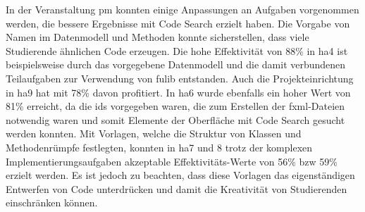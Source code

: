 In der Veranstaltung \ac{pm} konnten einige Anpassungen an Aufgaben vorgenommen werden, die bessere Ergebnisse mit Code Search erzielt haben.
Die Vorgabe von Namen im Datenmodell und Methoden konnte sicherstellen, dass viele Studierende ähnlichen Code erzeugen.
Die hohe Effektivität von 88\% in \ac{ha}4 ist beispielsweise durch das vorgegebene Datenmodell und die damit verbundenen Teilaufgaben zur Verwendung von fulib entstanden.
Auch die Projekteinrichtung in \ac{ha}9 hat mit 78\% davon profitiert.
In \ac{ha}6 wurde ebenfalls ein hoher Wert von 81\% erreicht, da die \acp{id} vorgegeben waren, die zum Erstellen der \ac{fxml}-Dateien notwendig waren und somit Elemente der Oberfläche mit Code Search gesucht werden konnten.
Mit Vorlagen, welche die Struktur von Klassen und Methodenrümpfe festlegten, konnten in \ac{ha}7 und 8 trotz der komplexen Implementierungsaufgaben akzeptable Effektivitäts-Werte von 56\% \ac{bzw} 59\% erzielt werden.
Es ist jedoch zu beachten, dass diese Vorlagen das eigenständigen Entwerfen von Code unterdrücken und damit die Kreativität von Studierenden einschränken können.
